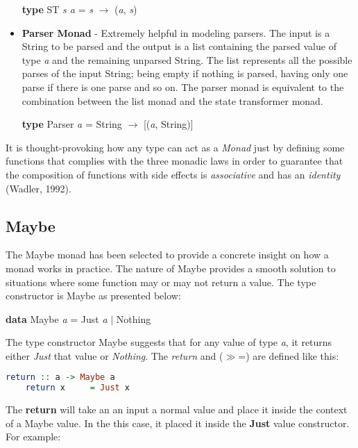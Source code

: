 \documentclass[a4paper, onecolumn]{article}
\begin{document}
\begin{itemize}
    \begin{center}
        \textbf{type} ST \textit{s a} = \textit{s} $\rightarrow$ (\textit{a}, \textit{s})
    \end{center}
    \item \textbf{Parser Monad} - Extremely helpful in modeling parsers. The input is a String to be parsed and the output is a list containing the parsed value of type \textit{a} and the remaining unparsed String. The list represents all the possible parses of the input String; being empty if nothing is parsed, having only one parse if there is one parse and so on. The parser monad is equivalent to the combination between the list monad and the state transformer monad.  
    \begin{center}
        \textbf{type} Parser \textit{a} = String $\rightarrow$ [(\textit{a}, String)] 
    \end{center}
\end{itemize}
It is thought-provoking how any type can act as a \textit{Monad} just by defining some functions that complies with the three monadic laws in order to guarantee that the composition of functions with side effects is \textit{associative} and has an \textit{identity} (Wadler, 1992).

\subsection{Maybe}
The Maybe monad has been selected to provide a concrete insight on how a monad works in practice. The nature of Maybe provides a smooth solution to situations where some function may or may not return a value. The type constructor is Maybe as presented below:

\begin{center}
    \textbf{data} Maybe \textit{a} = Just \textit{a} $\vert$ Nothing 
\end{center}
The type constructor Maybe suggests that for any value of type \textit{a}, it returns either \textit{Just} that value or \textit{Nothing}. The \textit{return} and ($\gg$=) are defined like this:
\begin{tcolorbox}
\begin{lstlisting}[language=Haskell]
    return :: a -> Maybe a
    return x     = Just x 
\end{lstlisting}
\end{tcolorbox}
The \textbf{return} will take an an input a normal value and place it inside the context of a Maybe value. In the this case, it placed it inside the \textbf{Just} value constructor. For example: 
\end{document}
